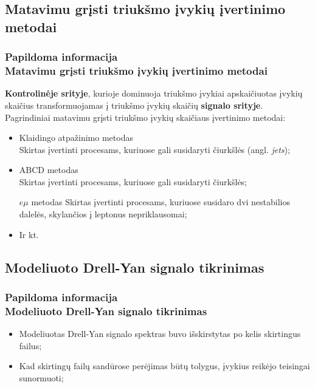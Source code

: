 \documentclass[xcolor=dvipsnames]{beamer}
\newcommand{\emu}{\mathit{e}\mu}
\begin{document}
\begin{frame}
\subsection{Matavimu grįsti triukšmo įvykių įvertinimo metodai}
\frametitle{Papildoma informacija\\ \small Matavimu grįsti triukšmo įvykių įvertinimo metodai}
\textbf{Kontrolinėje srityje}, kurioje dominuoja triukšmo įvykiai apskaičiuotas įvykių skaičius transformuojamas į triukšmo įvykių skaičių \textbf{signalo srityje}.\\
\vspace{0.3cm}
Pagrindiniai matavimu grįsti triukšmo įvykių skaičiaus įvertinimo metodai:
\begin{itemize}
\item Klaidingo atpažinimo metodas\\
Skirtas įvertinti procesams, kuriuose gali susidaryti čiurkšlės (angl. \textit{jets});
\item ABCD metodas\\
Skirtas įvertinti procesams, kuriuose gali susidaryti čiurkšlės;
\begin{block}{$\emu$ metodas}
Skirtas įvertinti procesams, kuriuose susidaro dvi nestabilios dalelės, skylančios į leptonus nepriklausomai;
\end{block}
\item Ir kt.
\end{itemize}
\end{frame}

\begin{frame}
\subsection{Modeliuoto Drell-Yan signalo tikrinimas}
\frametitle{Papildoma informacija\\ \normalsize Modeliuoto Drell-Yan signalo tikrinimas}
\begin{itemize}
\item Modeliuotas Drell-Yan signalo spektras buvo išskirstytas po kelis skirtingus failus;
\item Kad skirtingų failų sandūrose perėjimas būtų tolygus, įvykius reikėjo teisingai sunormuoti;
\end{itemize}
\end{frame}
\end{document}
